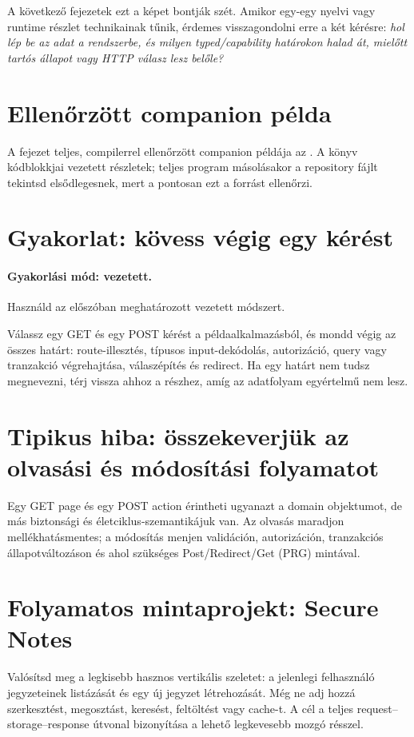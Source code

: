 A következő fejezetek ezt a képet bontják szét. Amikor egy-egy nyelvi vagy runtime részlet technikainak tűnik, érdemes visszagondolni erre a két kérésre: \emph{hol lép be az adat a rendszerbe, és milyen typed/capability határokon halad át, mielőtt tartós állapot vagy HTTP válasz lesz belőle?}

\section{Ellenőrzött companion példa}
A fejezet teljes, compilerrel ellenőrzött companion példája az . A könyv kódblokkjai vezetett részletek; teljes program másolásakor a repository fájlt tekintsd elsődlegesnek, mert a  pontosan ezt a forrást ellenőrzi.

\section{Gyakorlat: kövess végig egy kérést}
\paragraph{Gyakorlási mód: vezetett.} Használd az előszóban meghatározott vezetett módszert.

Válassz egy GET és egy POST kérést a példaalkalmazásból, és mondd végig az összes határt: route-illesztés, típusos input-dekódolás, autorizáció, query vagy tranzakció végrehajtása, válaszépítés és redirect. Ha egy határt nem tudsz megnevezni, térj vissza ahhoz a részhez, amíg az adatfolyam egyértelmű nem lesz.

\section{Tipikus hiba: összekeverjük az olvasási és módosítási folyamatot}
Egy GET page és egy POST action érintheti ugyanazt a domain objektumot, de más biztonsági és életciklus-szemantikájuk van. Az olvasás maradjon mellékhatásmentes; a módosítás menjen validáción, autorizáción, tranzakciós állapotváltozáson és ahol szükséges Post/Redirect/Get (PRG) mintával.

\section{Folyamatos mintaprojekt: Secure Notes}
Valósítsd meg a legkisebb hasznos vertikális szeletet: a jelenlegi felhasználó jegyzeteinek listázását és egy új jegyzet létrehozását. Még ne adj hozzá szerkesztést, megosztást, keresést, feltöltést vagy cache-t. A cél a teljes request--storage--response útvonal bizonyítása a lehető legkevesebb mozgó résszel.
